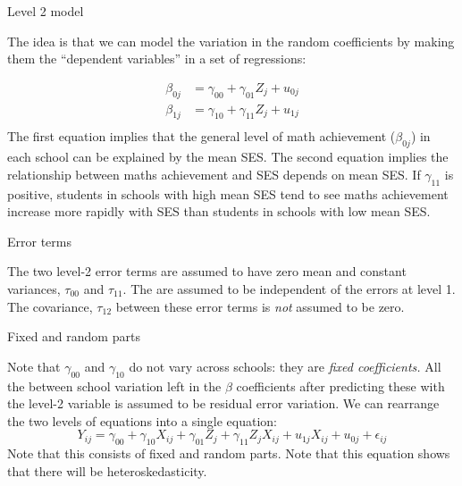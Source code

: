 \documentclass[10pt,ignorenonframetext,]{beamer}
\begin{document}
\begin{frame}{Level 2 model}

The idea is that we can model the variation in the random coefficients
by making them the ``dependent variables'' in a set of regressions:

\[
\begin{aligned}
\beta_{0j} &= \gamma_{00} + \gamma_{01} Z_j + u_{0j}\\
\beta_{1j} &= \gamma_{10} + \gamma_{11} Z_j + u_{1j}\\
\end{aligned}
\] The first equation implies that the general level of math achievement
(\(\beta_{0j}\)) in each school can be explained by the mean SES. The
second equation implies the relationship between maths achievement and
SES depends on mean SES. If \(\gamma_{11}\) is positive, students in
schools with high mean SES tend to see maths achievement increase more
rapidly with SES than students in schools with low mean SES.

\end{frame}

\begin{frame}{Error terms}

The two level-2 error terms are assumed to have zero mean and constant
variances, \(\tau_{00}\) and \(\tau_{11}.\) The are assumed to be
independent of the errors at level 1. The covariance, \(\tau_{12}\)
between these error terms is \emph{not} assumed to be zero.

\end{frame}

\begin{frame}{Fixed and random parts}

Note that \(\gamma_{00}\) and \(\gamma_{10}\) do not vary across
schools: they are \emph{fixed coefficients.} All the between school
variation left in the \(\beta\) coefficients after predicting these with
the level-2 variable is assumed to be residual error variation. We can
rearrange the two levels of equations into a single equation: \[
Y_{ij} = \gamma_{00} + \gamma_{10} X_{ij}+ \gamma_{01}Z_j + \gamma_{11}Z_jX_{ij}
+ u_{1j}X_{ij} + u_{0j} + \epsilon_{ij}
\] Note that this consists of fixed and random parts. Note that this
equation shows that there will be heteroskedasticity.

\end{frame}
\end{document}
